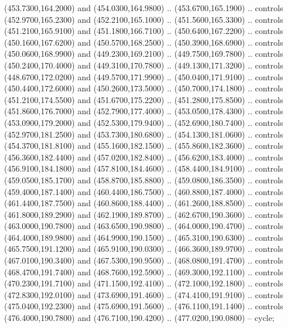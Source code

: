{\begin{scope}[y=0.80pt, x=0.80pt, yscale=-1, xscale=1, inner sep=0pt, outer sep=0pt, #1]
      (453.7300,164.2000) and (454.0300,164.9800) .. (453.6700,165.1900) .. controls
      (452.9700,165.2300) and (452.2100,165.1000) .. (451.5600,165.3300) .. controls
      (451.2100,165.9100) and (451.1800,166.7100) .. (450.6400,167.2200) .. controls
      (450.1600,167.6200) and (450.5700,168.2500) .. (450.3900,168.6900) .. controls
      (450.0600,168.9900) and (449.2300,169.2100) .. (449.7500,169.7800) .. controls
      (450.2400,170.4000) and (449.3100,170.7800) .. (449.1300,171.3200) .. controls
      (448.6700,172.0200) and (449.5700,171.9900) .. (450.0400,171.9100) .. controls
      (450.4400,172.6000) and (450.2600,173.5000) .. (450.7000,174.1800) .. controls
      (451.2100,174.5500) and (451.6700,175.2200) .. (451.2800,175.8500) .. controls
      (451.8600,176.7000) and (452.7900,177.4000) .. (453.0500,178.4300) .. controls
      (453.0900,179.2000) and (452.5300,179.9400) .. (452.6900,180.7400) .. controls
      (452.9700,181.2500) and (453.7300,180.6800) .. (454.1300,181.0600) .. controls
      (454.3700,181.8100) and (455.1600,182.1500) .. (455.8600,182.3600) .. controls
      (456.3600,182.4400) and (457.0200,182.8400) .. (456.6200,183.4000) .. controls
      (456.9100,184.1800) and (457.8100,184.4600) .. (458.4400,184.9100) .. controls
      (459.0500,185.1700) and (458.8700,185.8800) .. (459.0800,186.3500) .. controls
      (459.4000,187.1400) and (460.4400,186.7500) .. (460.8800,187.4000) .. controls
      (461.4400,187.7500) and (460.8600,188.4400) .. (461.2600,188.8500) .. controls
      (461.8000,189.2900) and (462.1900,189.8700) .. (462.6700,190.3600) .. controls
      (463.0000,190.7800) and (463.6500,190.9800) .. (464.0000,190.4700) .. controls
      (464.4000,189.9800) and (464.9900,190.1500) .. (465.3100,190.6300) .. controls
      (465.7500,191.1200) and (465.9100,190.0300) .. (466.3600,189.9700) .. controls
      (467.0100,190.3400) and (467.5300,190.9500) .. (468.0800,191.4700) .. controls
      (468.4700,191.7400) and (468.7600,192.5900) .. (469.3000,192.1100) .. controls
      (470.2300,191.7100) and (471.1500,192.4100) .. (472.1000,192.1800) .. controls
      (472.8300,192.0100) and (473.6900,191.4600) .. (474.4100,191.9100) .. controls
      (475.0400,192.2300) and (475.6900,191.5600) .. (476.1100,191.1400) .. controls
      (476.4000,190.7800) and (476.7100,190.4200) .. (477.0200,190.0800) -- cycle;


\end{scope}}
